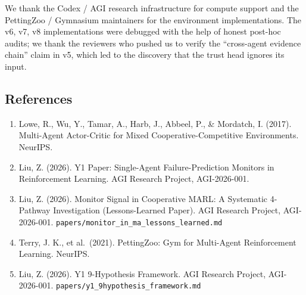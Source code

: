 \documentclass[
]{article}
\providecommand{\tightlist}{%
  \setlength{\itemsep}{0pt}\setlength{\parskip}{0pt}}
\begin{document}
We thank the Codex / AGI research infrastructure for compute support and
the PettingZoo / Gymnasium maintainers for the environment
implementations. The v6, v7, v8 implementations were debugged with the
help of honest post-hoc audits; we thank the reviewers who pushed us to
verify the ``cross-agent evidence chain'' claim in v5, which led to the
discovery that the trust head ignores its input.

\subsection{References}\label{references}

\begin{enumerate}
\def\labelenumi{\arabic{enumi}.}
\tightlist
\item
  Lowe, R., Wu, Y., Tamar, A., Harb, J., Abbeel, P., \& Mordatch, I.
  (2017). Multi-Agent Actor-Critic for Mixed Cooperative-Competitive
  Environments. NeurIPS.
\item
  Liu, Z. (2026). Y1 Paper: Single-Agent Failure-Prediction Monitors in
  Reinforcement Learning. AGI Research Project, AGI-2026-001.
\item
  Liu, Z. (2026). Monitor Signal in Cooperative MARL: A Systematic
  4-Pathway Investigation (Lessons-Learned Paper). AGI Research Project,
  AGI-2026-001. \texttt{papers/monitor\_in\_ma\_lessons\_learned.md}
\item
  Terry, J. K., et al.~(2021). PettingZoo: Gym for Multi-Agent
  Reinforcement Learning. NeurIPS.
\item
  Liu, Z. (2026). Y1 9-Hypothesis Framework. AGI Research Project,
  AGI-2026-001. \texttt{papers/y1\_9hypothesis\_framework.md}
\end{enumerate}
\end{document}
